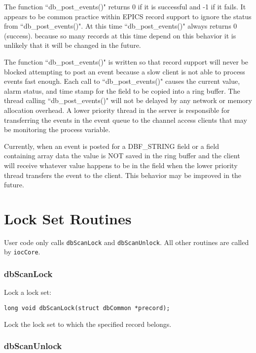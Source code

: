 The function ``db\_post\_events()" returns 0 if it is successful and -1 if it fails. It appears to be common practice within 
EPICS record support to ignore the status from ``db\_post\_events()". At this time ``db\_post\_events()" always returns 0 
(success). because so many records at this time depend on this behavior it is unlikely that it will be changed in the future.

The function ``db\_post\_events()" is written so that record support will never be blocked attempting to post an event 
because a slow client is not able to process events fast enough. Each call to ``db\_post\_events()" causes the current value, 
alarm status, and time stamp for the field to be copied into a ring buffer. The thread calling ``db\_post\_events()" will not be 
delayed by any network or memory allocation overhead. A lower priority thread in the server is responsible for 
transferring the events in the event queue to the channel access clients that may be monitoring the process variable.

Currently, when an event is posted for a DBF\_STRING field or a field containing array data the value is NOT saved in the 
ring buffer and the client will receive whatever value happens to be in the field when the lower priority thread transfers 
the event to the client. This behavior may be improved in the future.

\section{Lock Set Routines}

User code only calls \verb|dbScanLock| and \verb|dbScanUnlock|. All other routines are called by \verb|iocCore|.

\subsubsection{dbScanLock}

Lock a lock set:

\begin{verbatim}
long void dbScanLock(struct dbCommon *precord);
\end{verbatim}

Lock the lock set to which the specified record belongs.

\subsubsection{dbScanUnlock}

